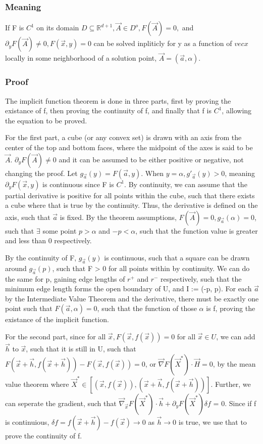 \documentclass[11 pt, twoside]{article}
\begin{document}
\subsubsection{Meaning}
If F is $C^1$ on its domain $D \subseteq \mathbb{R}^{d+1}, \vec{A} \in D^o, F(\vec{A}) = 0,$ and $\partial_yF(\vec{A}) \neq 0, F(\vec{x}, y) = 0$ can be solved inpliticly for y as a function of $vec{x}$ locally in some neighborhood of a solution point, $\vec{A} = (\vec{a}, \alpha)$.

\subsubsection{Proof}
The implicit function theorem is done in three parts, first by proving the existance of f, then proving the continuity of f, and finally that f is $C^1$, allowing the equation to be proved.

For the first part, a cube (or any convex set) is drawn with an axis from the center of the top and bottom faces, where the midpoint of the axes is said to be $\vec{A}$. $\partial_yF(\vec{A}) \neq 0$ and it can be assumed to be either positive or negative, not changing the proof. Let $g_\vec{a}(y) = F(\vec{a}, y)$. When $y = \alpha, g'_\vec{a}(y) > 0$, meaning $\partial_yF(\vec{x}, y)$ is continuous since F is $C^1$. By continuity, we can assume that the partial derivative is positive for all points within the cube, such that there exists a cube where that is true by the continuity. Thus, the derivative is defined on the axis, such that $\vec{a}$ is fixed. By the theorem assumptions, $F(\vec{A}) = 0, g_\vec{a}(\alpha) = 0$, such that $\exists$ some point $p > \alpha$ and $-p < \alpha$, such that the function value is greater and less than 0 respectively.

By the continuity of F, $g_\vec{a}(y)$ is continuous, such that a square can be drawn around  $g_\vec{a}(p)$, such that F > 0 for all points within by continuity. We can do the same for p, gaining edge lengths of $r^+$ and $r^-$ respectively, such that the minimum edge length forms the open boundary of U, and I := (-p, p). For each $\vec{a}$ by the Intermediate Value Theorem and the derivative, there must be exactly one point such that $F(\vec{a}, \alpha) = 0$, such that the function of those $\alpha$ is f, proving the existance of the implicit function.

For the second part, since for all $\vec{x}, F(\vec{x}, f(\vec{x})) = 0$ for all $\vec{x} \in U$, we can add $\vec{h}$ to $\vec{x}$, such that it is still in U, such that $F(\vec{x}+\vec{h}, f(\vec{x} + \vec{h})) - F(\vec{x}, f(\vec{x})) = 0$, or $\vec{\nabla}F(\vec{X}^*) \cdot \vec{H} = 0$, by the mean value theorem where $\vec{X}^* \in [(\vec{x}, f(\vec{x})), (\vec{x} + \vec{h}, f(\vec{x} + \vec{h}))]$. Further, we can seperate the gradient, such that $\vec{\nabla}_\vec{x}F(\vec{X}^*) \cdot \vec{h} + \partial_yF(\vec{X}^*)\delta f$ = 0. Since if f is continuious, $\delta f = f(\vec{x} + \vec{h}) - f(\vec{x}) \to 0$ as $\vec{h} \to 0$ is true, we use that to prove the continuity of f.
\end{document}

